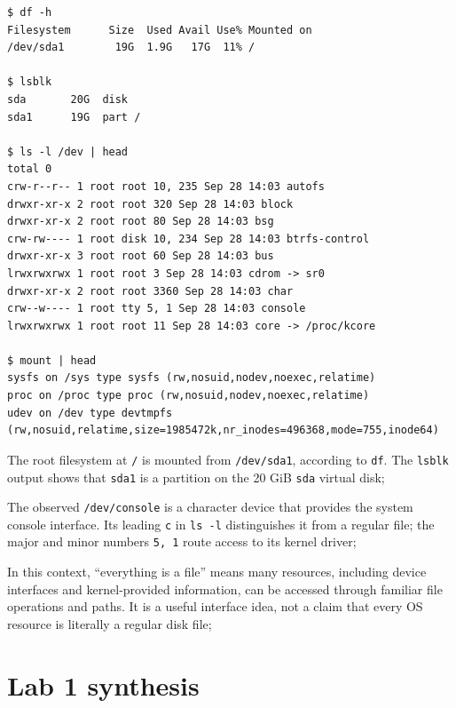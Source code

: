 \documentclass{assets/utmreport}
\begin{document}
\noindent\begin{minipage}{\linewidth}
\begin{lstlisting}[caption={Observed root filesystem and device node}]
$ df -h
Filesystem      Size  Used Avail Use% Mounted on
/dev/sda1        19G  1.9G   17G  11% /

$ lsblk
sda       20G  disk
sda1      19G  part /

$ ls -l /dev | head
total 0
crw-r--r-- 1 root root 10, 235 Sep 28 14:03 autofs
drwxr-xr-x 2 root root 320 Sep 28 14:03 block
drwxr-xr-x 2 root root 80 Sep 28 14:03 bsg
crw-rw---- 1 root disk 10, 234 Sep 28 14:03 btrfs-control
drwxr-xr-x 3 root root 60 Sep 28 14:03 bus
lrwxrwxrwx 1 root root 3 Sep 28 14:03 cdrom -> sr0
drwxr-xr-x 2 root root 3360 Sep 28 14:03 char
crw--w---- 1 root tty 5, 1 Sep 28 14:03 console
lrwxrwxrwx 1 root root 11 Sep 28 14:03 core -> /proc/kcore

$ mount | head
sysfs on /sys type sysfs (rw,nosuid,nodev,noexec,relatime)
proc on /proc type proc (rw,nosuid,nodev,noexec,relatime)
udev on /dev type devtmpfs (rw,nosuid,relatime,size=1985472k,nr_inodes=496368,mode=755,inode64)
\end{lstlisting}
\end{minipage}\par


\begin{utmenumerate}
\item The root filesystem at \texttt{/} is mounted from \texttt{/dev/sda1}, according to \texttt{df}. The \texttt{lsblk} output shows that \texttt{sda1} is a partition on the 20 GiB \texttt{sda} virtual disk;
\item The observed \texttt{/dev/console} is a character device that provides the system console interface. Its leading \texttt{c} in \texttt{ls -l} distinguishes it from a regular file; the major and minor numbers \texttt{5, 1} route access to its kernel driver;
\item In this context, “everything is a file” means many resources, including device interfaces and kernel-provided information, can be accessed through familiar file operations and paths. It is a useful interface idea, not a claim that every OS resource is literally a regular disk file;
\end{utmenumerate}

\section{Lab 1 synthesis}
\end{document}
